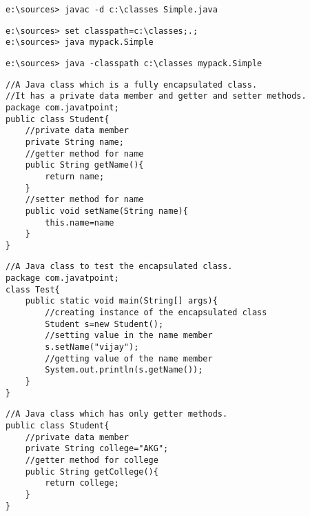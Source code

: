 \documentclass{book}
\def\lthtmlcheckvsize{\ifdim\ht\sizebox<\vsize 
  \ifdim\wd\sizebox<\hsize\expandafter\hfill\fi \expandafter\vfill
  \else\expandafter\vss\fi}%
\begin{document}
{\newpage\clearpage
{}%
\begin{lstlisting}
e:\sources> javac -d c:\classes Simple.java
\end{lstlisting}%
\lthtmlfigureZ
\lthtmlcheckvsize\clearpage}

{\newpage\clearpage
{}%
\begin{lstlisting}
e:\sources> set classpath=c:\classes;.;
e:\sources> java mypack.Simple
\end{lstlisting}%
\lthtmlfigureZ
\lthtmlcheckvsize\clearpage}

{\newpage\clearpage
{}%
\begin{lstlisting}
e:\sources> java -classpath c:\classes mypack.Simple
\end{lstlisting}%
\lthtmlfigureZ
\lthtmlcheckvsize\clearpage}

{\newpage\clearpage
{}%
\begin{lstlisting}
//A Java class which is a fully encapsulated class.  
//It has a private data member and getter and setter methods.  
package com.javatpoint;  
public class Student{  
	//private data member  
	private String name;  
	//getter method for name  
	public String getName(){  
		return name;  
	}  
	//setter method for name  
	public void setName(String name){  
		this.name=name  
	}  
}  
\end{lstlisting}%
\lthtmlfigureZ
\lthtmlcheckvsize\clearpage}

{\newpage\clearpage
{}%
\begin{lstlisting}
//A Java class to test the encapsulated class.  
package com.javatpoint;  
class Test{  
	public static void main(String[] args){  
		//creating instance of the encapsulated class  
		Student s=new Student();  
		//setting value in the name member  
		s.setName("vijay");  
		//getting value of the name member  
		System.out.println(s.getName());  
	}  
}  
\end{lstlisting}%
\lthtmlfigureZ
\lthtmlcheckvsize\clearpage}

{\newpage\clearpage
{}%
\begin{lstlisting}
//A Java class which has only getter methods.  
public class Student{  
	//private data member  
	private String college="AKG";  
	//getter method for college  
	public String getCollege(){  
		return college;  
	}  
}  
\end{lstlisting}%
\lthtmlfigureZ
\lthtmlcheckvsize\clearpage}
\end{document}
